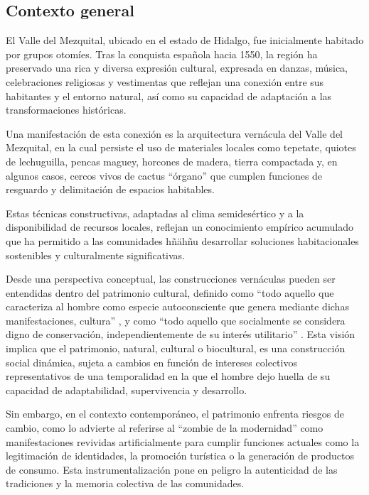 \subsection{Contexto general}

El Valle del Mezquital, ubicado en el estado de Hidalgo, fue inicialmente habitado por grupos otomíes. Tras la conquista española hacia 1550, la región ha preservado una rica y diversa expresión cultural, expresada en danzas, música, celebraciones religiosas y vestimentas que reflejan una conexión entre sus habitantes y el entorno natural, así como su capacidad de adaptación a las transformaciones históricas.

Una manifestación de esta conexión es la arquitectura vernácula del Valle del Mezquital, en la cual persiste el uso de materiales locales como tepetate, quiotes de lechuguilla, pencas maguey, horcones de madera, tierra compactada y, en algunos casos, cercos vivos de cactus \enquote{órgano} que cumplen funciones de resguardo y delimitación de espacios habitables.

Estas técnicas constructivas, adaptadas al clima semidesértico y a la disponibilidad de recursos locales, reflejan un conocimiento empírico acumulado que ha permitido a las comunidades hñähñu desarrollar soluciones habitacionales sostenibles y culturalmente significativas.

Desde una perspectiva conceptual, las construcciones vernáculas pueden ser entendidas dentro del patrimonio cultural, definido como \enquote{todo aquello que caracteriza al hombre como especie autoconsciente que genera mediante dichas manifestaciones, cultura} \citep{dominguez2004pautas}, y como \enquote{todo aquello que socialmente se considera digno de conservación, independientemente de su interés utilitario} \citep[p. 63]{prats1998concepto}. Esta visión implica que el patrimonio, natural, cultural o biocultural, es una construcción social dinámica, sujeta a cambios en función de intereses colectivos representativos de una temporalidad en la que el hombre dejo huella de su capacidad de adaptabilidad, supervivencia y desarrollo.

Sin embargo, en el contexto contemporáneo, el patrimonio enfrenta riesgos de cambio, como lo advierte \cite{i2008zombi} al referirse al \enquote{zombie de la modernidad} como manifestaciones revividas artificialmente para cumplir funciones actuales como la legitimación de identidades, la promoción turística o la generación de productos de consumo. Esta instrumentalización pone en peligro la autenticidad de las tradiciones y la memoria colectiva de las comunidades.

